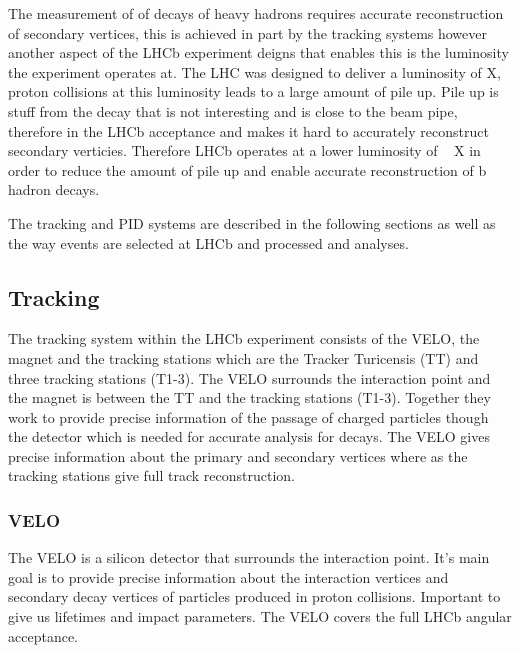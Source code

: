 The measurement of of decays of heavy hadrons requires accurate reconstruction of secondary vertices, this is achieved in part by the tracking systems however another aspect of the LHCb experiment deigns that enables this is the luminosity the experiment operates at. The LHC was designed to deliver a luminosity of X, proton collisions at this luminosity leads to a large amount of pile up. Pile up is stuff from the decay that is not interesting and is close to the beam pipe, therefore in the LHCb acceptance and makes it hard to accurately reconstruct secondary verticies. Therefore LHCb operates at a lower luminosity of ~ X in order to reduce the amount of pile up and enable accurate reconstruction of b hadron decays. 

The tracking and PID systems are described in the following sections as well as the way events are selected at LHCb and processed and analyses. 



\subsection{Tracking}
\label{Tracking}

The tracking system within the LHCb experiment consists of the VELO, the magnet and the tracking stations which are the Tracker Turicensis (TT) and three tracking stations (T1-3). The VELO surrounds the interaction point and the magnet is between the TT and the tracking stations (T1-3). Together they work to provide precise information of the passage of charged particles though the detector which is needed for accurate analysis for \bhadron decays. The VELO gives precise information about the primary and secondary vertices where as the tracking stations give full track reconstruction. 

\subsubsection{VELO}
\label{VELO}
The VELO is a silicon detector that surrounds the interaction point. It’s main goal is to provide precise information about the interaction vertices and secondary decay vertices of particles produced in proton collisions. Important to give us lifetimes and impact parameters. The VELO covers the full LHCb angular acceptance.

